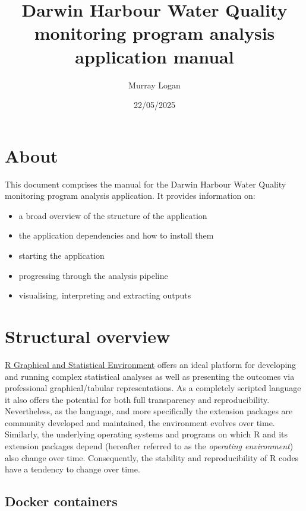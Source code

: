 \documentclass[
  8pt,
  a4paper]{article}
\title{Darwin Harbour Water Quality monitoring program analysis
application manual}
\author{Murray Logan}
\date{22/05/2025}
\providecommand{\tightlist}{%
  \setlength{\itemsep}{0pt}\setlength{\parskip}{0pt}}
\renewcommand*\contentsname{Table of contents}
\newcommand\contentsname{Table of contents}
\begin{document}
\maketitle

\renewcommand*\contentsname{Table of contents}
{
\hypersetup{linkcolor=}
\setcounter{tocdepth}{3}
\tableofcontents
}

\section{About}\label{about}

This document comprises the manual for the Darwin Harbour Water Quality
monitoring program analysis application. It provides information on:

\begin{itemize}
\tightlist
\item
  a broad overview of the structure of the application
\item
  the application dependencies and how to install them
\item
  starting the application
\item
  progressing through the analysis pipeline
\item
  visualising, interpreting and extracting outputs
\end{itemize}

\section{Structural overview}\label{structural-overview}

\href{https://www.r-project.org/}{R Graphical and Statistical
Environment} offers an ideal platform for developing and running complex
statistical analyses as well as presenting the outcomes via professional
graphical/tabular representations. As a completely scripted language it
also offers the potential for both full transparency and
reproducibility. Nevertheless, as the language, and more specifically
the extension packages are community developed and maintained, the
environment evolves over time. Similarly, the underlying operating
systems and programs on which R and its extension packages depend
(hereafter referred to as the \emph{operating environment}) also change
over time. Consequently, the stability and reproducibility of R codes
have a tendency to change over time.

\subsection{Docker containers}\label{docker-containers}
\end{document}
